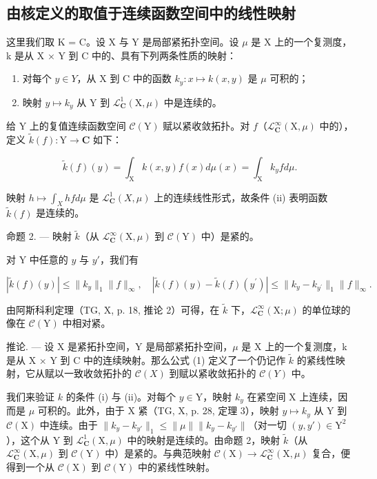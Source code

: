 \subsection{由核定义的取值于连续函数空间中的线性映射}

这里我们取 K = C。设 X 与 Y 是局部紧拓扑空间。设 \(\mu\) 是 X 上的一个复测度，k 是从 X × Y 到 C 中的、具有下列两条性质的映射：

\begin{enumerate}
\def\labelenumi{(\roman{enumi})}
\item
  对每个 \(y \in Y\)，从 X 到 C 中的函数 \(k_{y} \colon x \mapsto k(x, y)\) 是 \(\mu\) 可积的；
\item
  映射 \(y \mapsto k_{y}\) 从 Y 到 \(\mathcal{L}_{\mathbf{C}}^{1}(\mathrm{X}, \mu)\) 中是连续的。
\end{enumerate}

给 Y 上的复值连续函数空间 \(\mathcal{C}(\mathrm{Y})\) 赋以紧收敛拓扑。对 \(f\)（\(\mathcal{L}_{\mathbf{C}}^{\infty}(\mathrm{X},\mu)\) 中的），定义 \(\widetilde{k}(f)\colon \mathrm{Y}\to \mathbf{C}\) 如下：

\[
\widetilde {k} (f) (y) = \int_ {\mathrm{X}} k (x, y) f (x) d \mu (x) = \int_ {\mathrm{X}} k _ {y} f d \mu .\tag{1}
\]

映射 \(h \mapsto \int_{X} hfd\mu\) 是 \(\mathcal{L}_{\mathbf{C}}^{1}(X,\mu)\) 上的连续线性形式，故条件 (ii) 表明函数 \(\widetilde{k}(f)\) 是连续的。

命题 2. — 映射 \(\widetilde{k}\)（从 \(\mathcal{L}_{\mathbf{C}}^{\infty}(\mathrm{X},\mu)\) 到 \(\mathcal{C}(\mathrm{Y})\) 中）是紧的。

对 Y 中任意的 \(y\) 与 \(y'\)，我们有

\[
| \widetilde {k} (f) (y) | \leqslant \| k _ {y} \| _ {1} \| f \| _ {\infty}, \quad | \widetilde {k} (f) (y) - \widetilde {k} (f) (y ^ {\prime}) | \leqslant \| k _ {y} - k _ {y ^ {\prime}} \| _ {1} \| f \| _ {\infty}.
\]

由阿斯科利定理（TG, X, p. 18, 推论 2）可得，在 \(\widetilde{k}\) 下，\(\mathcal{L}_{\mathbf{C}}^{\infty}(\mathrm{X};\mu)\) 的单位球的像在 \(\mathcal{C}(\mathrm{Y})\) 中相对紧。

推论. --- 设 X 是紧拓扑空间，Y 是局部紧拓扑空间，\(\mu\) 是 X 上的一个复测度，k 是从 X × Y 到 C 中的连续映射。那么公式 (1) 定义了一个仍记作 \(\widetilde{k}\) 的紧线性映射，它从赋以一致收敛拓扑的 \(\mathcal{C}(X)\) 到赋以紧收敛拓扑的 \(\mathcal{C}(Y)\) 中。

我们来验证 \(k\) 的条件 (i) 与 (ii)。对每个 \(y \in \mathrm{Y}\)，映射 \(k_y\) 在紧空间 X 上连续，因而是 \(\mu\) 可积的。此外，由于 X 紧（TG, X, p. 28, 定理 3），映射 \(y \mapsto k_y\) 从 Y 到 \(\mathcal{C}(\mathrm{X})\) 中连续。由于 \(\| k_y - k_{y'} \|_1 \leqslant \| \mu \| \| k_y - k_{y'} \|\)（对一切 \((y, y') \in \mathrm{Y}^2\)），这个从 Y 到 \(\mathcal{L}_{\mathbf{C}}^1(\mathrm{X}, \mu)\) 中的映射是连续的。由命题 2，映射 \(\widetilde{k}\)（从 \(\mathcal{L}_{\mathbf{C}}^\infty(\mathrm{X}, \mu)\) 到 \(\mathcal{C}(\mathrm{Y})\) 中）是紧的。与典范映射 \(\mathcal{C}(\mathrm{X}) \to \mathcal{L}_{\mathbf{C}}^\infty(\mathrm{X}, \mu)\) 复合，便得到一个从 \(\mathcal{C}(\mathrm{X})\) 到 \(\mathcal{C}(\mathrm{Y})\) 中的紧线性映射。
\relax{}
